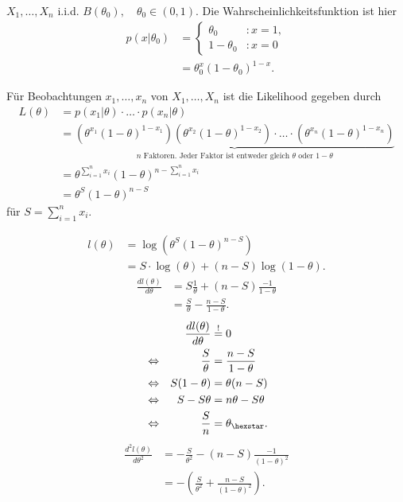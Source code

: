 \documentclass{tstextbook}
\begin{document}
\begin{example}
	$ X_1,\ldots,X_n $ i.i.d. $ B(\theta_0), \quad \theta_0 \in (0,1) $. Die Wahrscheinlichkeitsfunktion ist hier 
	\[
	\begin{aligned}
	p(x|\theta_0) & =\left\{\begin{array}{ll}
		\theta_0 & \colon x=1, \\
		1-\theta_0 & \colon x=0 \end{array}\right .\\
	& = \theta_0^x(1-\theta_0)^{1-x}.
	\end{aligned}
	\]
	
	Für Beobachtungen $ x_1,\ldots,x_n $ von $ X_1,\ldots,X_n $ ist die Likelihood gegeben durch 
	\[
	\begin{aligned}
		L(\theta) & = p(x_1|\theta)\cdot\ldots\cdot p(x_n|\theta) \\
		& = \underbrace{\left(\theta^{x_1}(1-\theta)^{1-x_1}\right)\left(\theta^{x_2}(1-\theta)^{1-x_2}\right)\cdot\ldots\cdot \left(\theta^{x_n}(1-\theta)^{1-x_n}\right)}_{n \text{ Faktoren. Jeder Faktor ist entweder gleich }\theta \text{ oder } 1-\theta} \\
		& = \theta^{\sum_{i=1}^{n}x_i}(1-\theta)^{n-\sum_{i=1}^{n}x_i} \\
		& = \theta^S (1-\theta)^{n-S}
	\end{aligned}
	\] 
	für $ S = \sum_{i=1}^{n}x_i $.
	
	\[
	\begin{aligned}
		l(\theta) & = \log\left(\theta^S(1-\theta)^{n-S}\right) \\
		& = S\cdot \log(\theta) + (n-S)\log(1-\theta).
	\end{aligned}
	\]
\vspace{0.5cm}	
	\[
	\begin{aligned}
		\frac{dl(\theta)}{d\theta} & = S \frac{1}{\theta} + (n-S)\frac{-1}{1-\theta} \\
		& = \frac{S}{\theta} -\frac{n-S}{1-\theta}.		
	\end{aligned}
	\]
\vspace{0.5cm}	
	\[
	\begin{aligned}
		&& \frac{dl(\theta)}{d\theta} & \overset{!}{=} 0 \\
		& \Leftrightarrow & \frac{S}{\theta} & = \frac{n-S}{1-\theta} \\
		& \Leftrightarrow & S(1-\theta) & = \theta (n-S) \\
		& \Leftrightarrow & S -S\theta & = n\theta - S\theta \\
		& \Leftrightarrow & \frac{S}{n} & = \theta_{\hexstar}.
	\end{aligned}
	\]
\vspace{0.5cm}	
	\[
	\begin{aligned}
		\frac{d^2l(\theta)}{d\theta^2} & = -\frac{S}{\theta^2} -(n-S)\frac{-1}{(1-\theta)^2}\\
		& = -\left(\frac{S}{\theta^2}+\frac{n-S}{(1-\theta)^2}\right). 
	\end{aligned}
	\]
	

\end{example}
\end{document}
